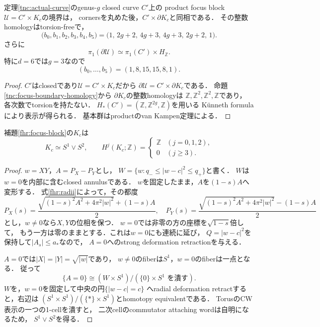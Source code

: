 \begin{corollary}
\label{tnc:focus-boundary-betti}
定理\ref{tnc:actual-curve}のgenus-$g$ closed curve $C'$上の
product focus block $\mathcal U=C'\times K_c$の境界は，
cornersを丸めた後，$C'\times\partial K_c$と同相である．
その整数homologyはtorsion-freeで，
\[
 \bigl(b_0,b_1,b_2,b_3,b_4,b_5\bigr)
 =\bigl(1,\,2g+2,\,4g+3,\,4g+3,\,2g+2,\,1\bigr).
\]
さらに
\[
 \pi_1(\partial\mathcal U)
 \simeq\pi_1(C')\times H_{\mathbb Z}.
\]
特に$d=6$では$g=3$なので
\[
 (b_0,\ldots,b_5)=(1,8,15,15,8,1).
\]
\end{corollary}
\begin{proof}
$C'$はclosedであり$\mathcal U=C'\times K_c$だから
$\partial\mathcal U=C'\times\partial K_c$である．
命題\ref{tnc:focus-boundary-homology}から
$\partial K_c$の整数homologyは
$\mathbb Z,\mathbb Z^2,\mathbb Z^2,\mathbb Z$であり，
各次数でtorsionを持たない．
$H_*(C')=(\mathbb Z,\mathbb Z^{2g},\mathbb Z)$を用いる
K\"unneth formulaにより表示が得られる．
基本群はproductのvan Kampen定理による．
\end{proof}

\begin{lemma}
\label{tnc:focus-homotopy}
補題\ref{fhr:focus-block}の$K_c$は
\[
 K_c\simeq S^1\vee S^2,\qquad
 H^j(K_c;\mathbb Z)=
 \begin{cases}\mathbb Z&(j=0,1,2),\\0&(j\ge3).\end{cases}
\]
\end{lemma}
\begin{proof}
$w=XY$，$A=P_X-P_Y$とし，
$W=\{w:q_-\le|w-c|^2\le q_+\}$と書く．
$W$は$w=0$を内部に含むclosed annulusである．
$w$を固定したまま，$A$を$(1-s)A$へ変形する．
式\eqref{fhr:radii}によって，その都度
\[
 P_X(s)=\frac{\sqrt{(1-s)^2A^2+4\pi^2|w|^2}+(1-s)A}{2},
 \quad
 P_Y(s)=\frac{\sqrt{(1-s)^2A^2+4\pi^2|w|^2}-(1-s)A}{2}
\]
とし，$w\ne0$なら$X,Y$の位相を保つ．
$w=0$では非零の方の座標を$\sqrt{1-s}$倍して，
もう一方は零のままとする．これは$w=0$にも連続に延び，
$Q=|w-c|^2$を保持して$|A_s|\le a_*$なので，
$A=0$へのstrong deformation retractionを与える．

$A=0$では$|X|=|Y|=\sqrt{|w|}$であり，
$w\ne0$のfiberは$S^1$，$w=0$のfiberは一点となる．
従って
\[
 \{A=0\}\cong(W\times S^1)/(\{0\}\times S^1\text{ を潰す}).
\]
$W$を，$w=0$を固定して中央の円$\{|w-c|=c\}$
へradial deformation retractすると，右辺は
$(S^1\times S^1)/(\{*\}\times S^1)$とhomotopy equivalentである．
TorusのCW表示の一つの1-cellを潰すと，
二次cellのcommutator attaching wordは自明になるため，
$S^1\vee S^2$を得る．
\end{proof}

